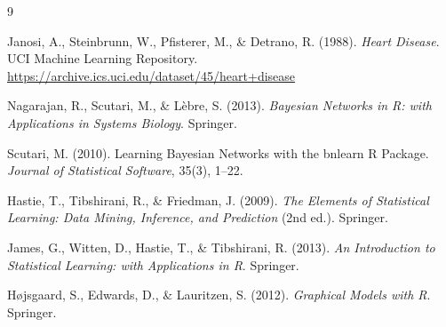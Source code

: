 \documentclass[11pt, a4paper]{article}
\begin{document}
	\vspace{1em}
	
	\begin{table}[H]
		\centering
		\caption{Complete Cases (global only)}
	\end{table}
	
	\newpage
	\begin{thebibliography}{9}
		
		Janosi, A., Steinbrunn, W., Pfisterer, M., \& Detrano, R. (1988). \textit{Heart Disease}. UCI Machine Learning Repository. \url{https://archive.ics.uci.edu/dataset/45/heart+disease}
		
		 Nagarajan, R., Scutari, M., \& Lèbre, S. (2013). \textit{Bayesian Networks in R: with Applications in Systems Biology}. Springer.		
		
		Scutari, M. (2010). Learning Bayesian Networks with the bnlearn R Package. \textit{Journal of Statistical Software}, 35(3), 1--22.
		
		Hastie, T., Tibshirani, R., \& Friedman, J. (2009). \textit{The Elements of Statistical Learning: Data Mining, Inference, and Prediction} (2nd ed.). Springer.
		
		James, G., Witten, D., Hastie, T., \& Tibshirani, R. (2013). \textit{An Introduction to Statistical Learning: with Applications in R}. Springer.
		
		Højsgaard, S., Edwards, D., \& Lauritzen, S. (2012). \textit{Graphical Models with R}. Springer. 
		
		
		
	\end{thebibliography}
\end{document}

